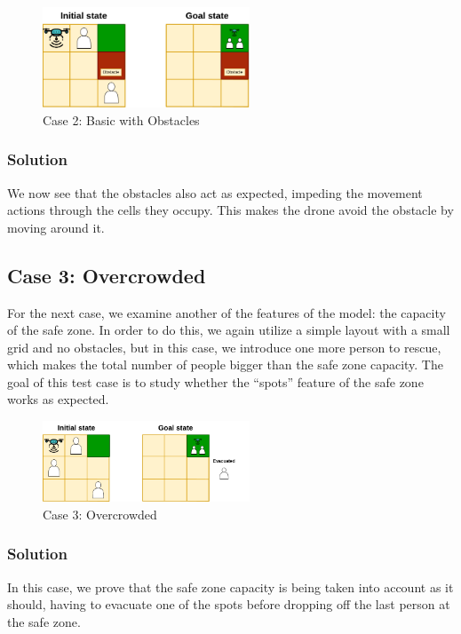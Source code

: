 \documentclass{article}
\begin{document}
\begin{figure}[H]
    \centering
    \includegraphics[width=0.55\textwidth]{assets/problem-2-basic-obstacle.drawio.png}
    \caption{Case 2: Basic with Obstacles}
    \label{fig:initial-state-obstacles}
\end{figure}

\subsubsection{Solution}
We now see that the obstacles also act as expected, impeding the movement actions through the cells they occupy. This makes the drone avoid the obstacle by moving around it.

\subsection{Case 3: Overcrowded}

For the next case, we examine another of the features of the model: the capacity of the safe zone. In order to do this, we again utilize a simple layout with a small grid and no obstacles, but in this case, we introduce one more person to rescue, which makes the total number of people bigger than the safe zone capacity. The goal of this test case is to study whether the “spots” feature of the safe zone works as expected.

\begin{figure}[H]
    \centering
    \includegraphics[width=0.55\textwidth]{assets/problem-3-overcrowded.drawio.png}
    \caption{Case 3: Overcrowded}
    \label{fig:initial-state-overcrowded}
\end{figure}

\subsubsection{Solution}
In this case, we prove that the safe zone capacity is being taken into account as it should, having to evacuate one of the spots before dropping off the last person at the safe zone.
\end{document}
